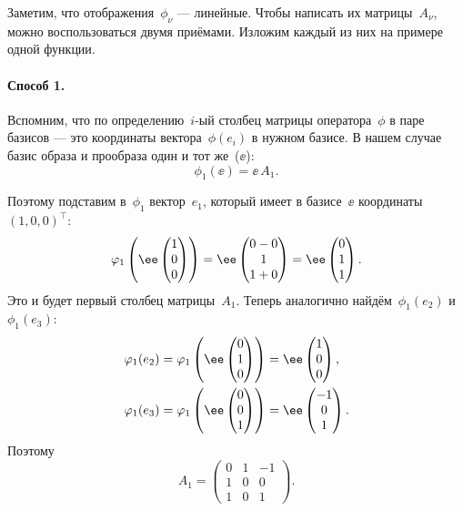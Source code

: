 \begin{solution}
	Заметим, что отображения~$\phi_\nu$ --- линейные. Чтобы написать их матрицы~$A_\nu$, можно воспользоваться двумя приёмами. Изложим каждый из них на примере одной функции.

	\paragraph{Способ 1.} Вспомним, что по определению~$i$-ый столбец матрицы оператора~$\phi$ в паре базисов --- это координаты вектора~$\phi(e_i)$ в нужном базисе. В нашем случае базис образа и прообраза один и тот же~($\ee$):
	\[
		\phi_1(\ee) = \ee\,A_1
		.
	\]

	Поэтому подставим в~$\phi_1$ вектор~$e_1$, который имеет в базисе~$\ee$ координаты~$(1, 0, 0)^\top$:
	\[
		\phi_1
		\left( 
			\ee
			\Vect{
				1 \\ 0 \\ 0
			}
		\right)
		=
		\ee
		\Vect{
			0 - 0 \\
			1 \\
			1 + 0
		}
		=
		\ee
		\Vect{
			0 \\ 1 \\ 1
		}
		.
	\]
	Это и будет первый столбец матрицы~$A_1$. Теперь аналогично найдём~$\phi_1(e_2)$ и $\phi_1(e_3)$:
	\begin{align*}
		\phi_1(e_2) &=
		\phi_1
		\left( 
			\ee
			\Vect{
				0 \\ 1 \\ 0
			}
		\right)
		=
		\ee
		\Vect{
			1 \\ 0 \\ 0
		},
		\\
		\phi_1(e_3) &=
		\phi_1
		\left( 
			\ee
			\Vect{
				0 \\ 0 \\ 1
			}
		\right)
		=
		\ee
		\Vect{
			-1 \\ 0 \\ 1
		}.
	\end{align*}
	Поэтому
	\[
		A_1 =
		\begin{pmatrix}
			0 & 1 & -1
			\\
			1 & 0 & 0
			\\
			1 & 0 & 1
		\end{pmatrix}
		.
	\]


\end{solution}
